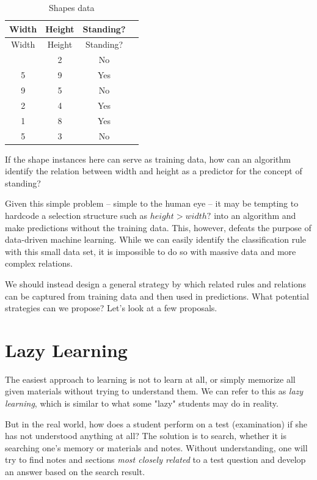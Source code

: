 \documentclass[
  letterpaper,
]{scrbook}
\begin{document}
\protect{}\label{tab-bin-shapes}
\begin{longtable}[]{@{}cccl@{}}
\caption{Shapes data}\tabularnewline
\toprule\noalign{}
Width & Height & Standing? & \\
\midrule\noalign{}
\endfirsthead
\toprule\noalign{}
Width & Height & Standing? & \\
\midrule\noalign{}
\endhead
\bottomrule\noalign{}
\endlastfoot
4 & 2 & No & \\
5 & 9 & Yes & \\
9 & 5 & No & \\
2 & 4 & Yes & \\
1 & 8 & Yes & \\
5 & 3 & No & \\
\end{longtable}

\protect{}\label{tab-bin-shapes}{}

If the shape instances here can serve as training data, how can an
algorithm identify the relation between width and height as a predictor
for the concept of standing?

Given this simple problem -- simple to the human eye -- it may be
tempting to hardcode a selection structure such as \(height>width?\)
into an algorithm and make predictions without the training data. This,
however, defeats the purpose of data-driven machine learning. While we
can easily identify the classification rule with this small data set, it
is impossible to do so with massive data and more complex relations.

We should instead design a general strategy by which related rules and
relations can be captured from training data and then used in
predictions. What potential strategies can we propose? Let's look at a
few proposals.

\section{Lazy Learning}\label{lazy-learning}

The easiest approach to learning is not to learn at all, or simply
memorize all given materials without trying to understand them. We can
refer to this as \emph{lazy learning}, which is similar to what some
"lazy" students may do in reality.

But in the real world, how does a student perform on a test
(examination) if she has not understood anything at all? The solution is
to search, whether it is searching one's memory or materials and notes.
Without understanding, one will try to find notes and sections
\emph{most closely related} to a test question and develop an answer
based on the search result.
\end{document}
